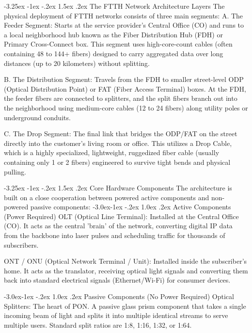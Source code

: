 \documentclass[11pt,a4paper]{report}
\makeatletter
\renewcommand{\section}{\@startsection{section}{1}{\z@}%
  {-3.25ex \@plus -1ex \@minus -.2ex}%
  {1.5ex \@plus.2ex}%
  {\normalfont\Large\bfseries\color{primaryColor}}}
\renewcommand{\subsection}{\@startsection{subsection}{2}{\z@}%
  {-3.0ex\@plus -1ex \@minus -.2ex}%
  {1.0ex \@plus .2ex}%
  {\normalfont\large\bfseries\color{secondaryColor}}}
\makeatother
\begin{document}
\section{The FTTH Network Architecture Layers}
The physical deployment of FTTH networks consists of three main segments:
A. The Feeder Segment: Starts at the service provider's Central Office (CO) and runs to a local neighborhood hub known as the Fiber Distribution Hub (FDH) or Primary Cross-Connect box. This segment uses high-core-count cables (often containing 48 to 144+ fibers) designed to carry aggregated data over long distances (up to 20 kilometers) without splitting.


B. The Distribution Segment: Travels from the FDH to smaller street-level ODP (Optical Distribution Point) or FAT (Fiber Access Terminal) boxes. At the FDH, the feeder fibers are connected to splitters, and the split fibers branch out into the neighborhood using medium-core cables (12 to 24 fibers) along utility poles or underground conduits.


C. The Drop Segment: The final link that bridges the ODP/FAT on the street directly into the customer's living room or office. This utilizes a Drop Cable, which is a highly specialized, lightweight, ruggedized fiber cable (usually containing only 1 or 2 fibers) engineered to survive tight bends and physical pulling.


\section{Core Hardware Components}
The architecture is built on a close cooperation between powered active components and non-powered passive components:
\subsection{Active Components (Power Required)}
OLT (Optical Line Terminal): Installed at the Central Office (CO). It acts as the central 'brain' of the network, converting digital IP data from the backbone into laser pulses and scheduling traffic for thousands of subscribers.


ONT / ONU (Optical Network Terminal / Unit): Installed inside the subscriber's home. It acts as the translator, receiving optical light signals and converting them back into standard electrical signals (Ethernet/Wi-Fi) for consumer devices.


\subsection{Passive Components (No Power Required)}
Optical Splitters: The heart of PON. A passive glass prism component that takes a single incoming beam of light and splits it into multiple identical streams to serve multiple users. Standard split ratios are 1:8, 1:16, 1:32, or 1:64.
\end{document}

